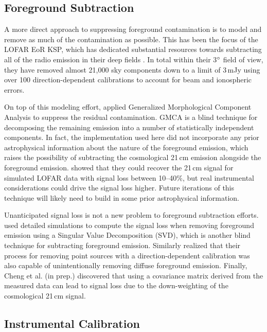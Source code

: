 \begin{bibunit}
\subsection{Foreground Subtraction}

A more direct approach to suppressing foreground contamination is to model and remove as much of the
contamination as possible. This has been the focus of the LOFAR EoR KSP, which has dedicated
substantial resources towards subtracting all of the radio emission in their deep fields
\citep{2017ApJ...838...65P}. In total within their 3$\mbox{$^\circ$}$ field of view, they have removed
almost 21,000 sky components down to a limit of 3\,mJy using over 100 direction-dependent
calibrations to account for beam and ionospheric errors.

On top of this modeling effort, \citet{2017ApJ...838...65P} applied Generalized Morphological
Component Analysis \citep[GMCA;][]{2013MNRAS.429..165C} to suppress the residual contamination.
GMCA is a blind technique for decomposing the remaining emission into a number of statistically
independent components. In fact, the implementation used here did not incorporate any prior
astrophysical information about the nature of the foreground emission, which raises the possibility
of subtracting the cosmological 21\,cm emission alongside the foreground emission.
\citet{2013MNRAS.429..165C} showed that they could recover the 21\,cm signal for simulated LOFAR
data with signal loss between 10--40\%, but real instrumental considerations could drive the signal
loss higher. Future iterations of this technique will likely need to build in some prior
astrophysical information.

Unanticipated signal loss is not a new problem to foreground subtraction efforts.
\citet{2013MNRAS.433..639P} used detailed simulations to compute the signal loss when removing
foreground emission using a Singular Value Decomposition (SVD), which is another blind technique for
subtracting foreground emission. Similarly \citet{2016MNRAS.463.4317P} realized that their process
for removing point sources with a direction-dependent calibration was also capable of
unintentionally removing diffuse foreground emission. Finally, Cheng et al. (in prep.) discovered
that using a covariance matrix derived from the measured data can lead to signal loss due to the
down-weighting of the cosmological 21\,cm signal.

\subsection{Instrumental Calibration}


\end{bibunit}
